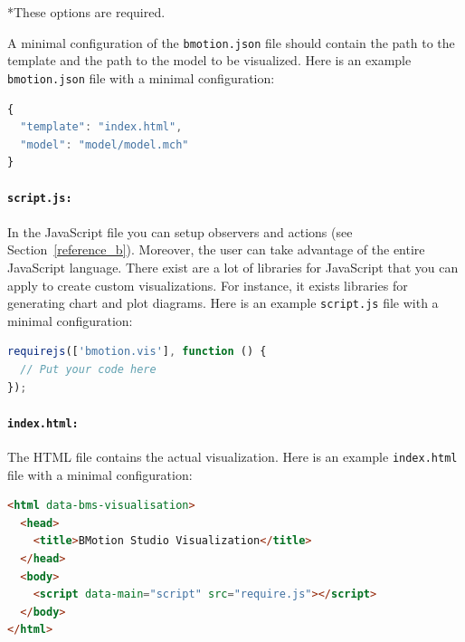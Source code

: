 *These options are required.

\vspace*{0.5cm}

A minimal configuration of the \texttt{bmotion.json} file should contain the path to the template and the path to the model to be visualized.
Here is an example \texttt{bmotion.json} file with a minimal configuration:

\begin{lstlisting}[language=JavaScript]
{
  "template": "index.html",
  "model": "model/model.mch"
}
\end{lstlisting}


\paragraph{\texttt{script.js:}}
In the JavaScript file you can setup observers and actions (see Section~\ref{reference_b}).
Moreover, the user can take advantage of the entire JavaScript language.
There exist are a lot of libraries for JavaScript that you can apply to create custom visualizations.
For instance, it exists libraries for generating chart and plot diagrams.
Here is an example \texttt{script.js} file with a minimal configuration:

\begin{lstlisting}[language=JavaScript]
requirejs(['bmotion.vis'], function () {
  // Put your code here
});
\end{lstlisting}


\paragraph{\texttt{index.html:}}
The HTML file contains the actual visualization.
Here is an example \texttt{index.html} file with a minimal configuration:

\begin{lstlisting}[language=html]
<html data-bms-visualisation>
  <head>
    <title>BMotion Studio Visualization</title>
  </head>
  <body>
    <script data-main="script" src="require.js"></script>
  </body>
</html>
\end{lstlisting}

